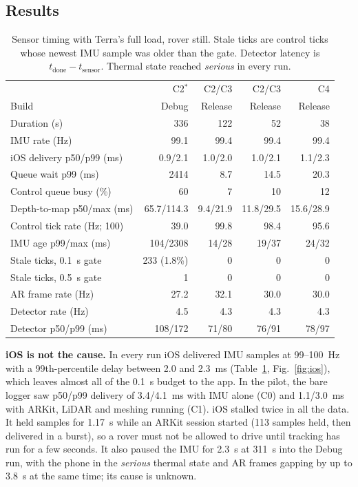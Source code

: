 \documentclass[conference]{IEEEtran}
\newcommand{\tsens}{t_{\text{sensor}}}
\newcommand{\tdone}{t_{\text{done}}}
\begin{document}
\subsection{Results}

\begin{table}[t]
\centering
\caption{Sensor timing with Terra's full load, rover still. Stale ticks are control ticks whose newest IMU sample was older than the gate. Detector latency is $\tdone - \tsens$. Thermal state reached \emph{serious} in every run.}
\label{tab:timing}
\footnotesize
\setlength{\tabcolsep}{2.2pt}
\begin{tabular}{@{}l r r r r@{}}
\toprule
 & C2$^{*}$ & C2/C3 & C2/C3 & C4 \\
Build & Debug & Release & Release & Release \\
\midrule
Duration (s) & 336 & 122 & 52 & 38 \\
IMU rate (Hz) & 99.1 & 99.4 & 99.4 & 99.4 \\
iOS delivery p50/p99 (ms) & 0.9/2.1 & 1.0/2.0 & 1.0/2.1 & 1.1/2.3 \\
Queue wait p99 (ms) & 2414 & 8.7 & 14.5 & 20.3 \\
Control queue busy (\%) & 60 & 7 & 10 & 12 \\
Depth-to-map p50/max (ms) & 65.7/114.3 & 9.4/21.9 & 11.8/29.5 & 15.6/28.9 \\
Control tick rate (Hz; 100) & 39.0 & 99.8 & 98.4 & 95.6 \\
IMU age p99/max (ms) & 104/2308 & 14/28 & 19/37 & 24/32 \\
Stale ticks, 0.1~s gate & 233 (1.8\%) & 0 & 0 & 0 \\
Stale ticks, 0.5~s gate & 1 & 0 & 0 & 0 \\
AR frame rate (Hz) & 27.2 & 32.1 & 30.0 & 30.0 \\
Detector rate (Hz) & 4.5 & 4.3 & 4.3 & 4.3 \\
Detector p50/p99 (ms) & 108/172 & 71/80 & 76/91 & 78/97 \\
\bottomrule
\end{tabular}
\end{table}

\textbf{iOS is not the cause.}
In every run iOS delivered IMU samples at 99--100~Hz with a 99th-percentile delay between 2.0 and 2.3~ms (Table~\ref{tab:timing}, Fig.~\ref{fig:ios}), which leaves almost all of the 0.1~s budget to the app.
In the pilot, the bare logger saw p50/p99 delivery of 3.4/4.1~ms with IMU alone (C0) and 1.1/3.0~ms with ARKit, LiDAR and meshing running (C1).
iOS stalled twice in all the data.
It held samples for 1.17~s while an ARKit session started (113 samples held, then delivered in a burst), so a rover must not be allowed to drive until tracking has run for a few seconds.
It also paused the IMU for 2.3~s at 311~s into the Debug run, with the phone in the \emph{serious} thermal state and AR frames gapping by up to 3.8~s at the same time; its cause is unknown.
\end{document}
